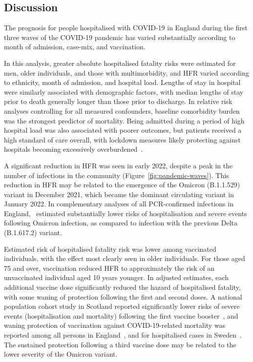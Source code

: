 \subsection{Discussion}

The prognosis for people hospitalised with COVID-19 in England during the first three waves of the COVID-19 pandemic has varied substantially according to month of admission, case-mix, and vaccination.

In this analysis, greater absolute hospitalised fatality risks were estimated for men, older individuals, and those with multimorbidity, and HFR varied according to ethnicity, month of admission, and hospital load. Lengths of stay in hospital were similarly associated with demographic factors, with median lengths of stay prior to death generally longer than those prior to discharge. In relative risk analyses controlling for all measured confounders, baseline comorbidity burden was the strongest predictor of mortality. Being admitted during a period of high hospital load was also associated with poorer outcomes, but patients received a high standard of care overall, with lockdown measures likely protecting against hospitals becoming excessively overburdened~\parencite{Davies2020-kk}.

A significant reduction in HFR was seen in early 2022, despite a peak in the number of infections in the community (Figure~\ref{fig:pandemic-waves}). This reduction in HFR may be related to the emergence of the Omicron (B.1.1.529) variant in December 2021, which became the dominant circulating variant in January 2022. In complementary analyses of all PCR-confirmed infections in England,~\cite{Nyberg2022-jz} estimated substantially lower risks of hospitalisation and severe events following Omicron infection, as compared to infection with the previous Delta (B.1.617.2) variant.

Estimated risk of hospitalised fatality risk was lower among vaccinated individuals, with the effect most clearly seen in older individuals. For those aged 75 and over, vaccination reduced HFR to approximately the risk of an unvaccinated individual aged 10 years younger. In adjusted estimates, each additional vaccine dose significantly reduced the hazard of hospitalised fatality, with some waning of protection following the first and second doses. A national population cohort study in Scotland reported significantly lower risks of severe events (hospitalisation and mortality) following the first vaccine booster~\parencite{Agrawal2021-uz}, and waning protection of vaccination against COVID-19-related mortality was reported among all persons in England~\parencite{Andrews2022-qd}, and for hospitalised cases in Sweden~\parencite{Nordstrom2022-gf}. The sustained protection following a third vaccine dose may be related to the lower severity of the Omicron variant.

